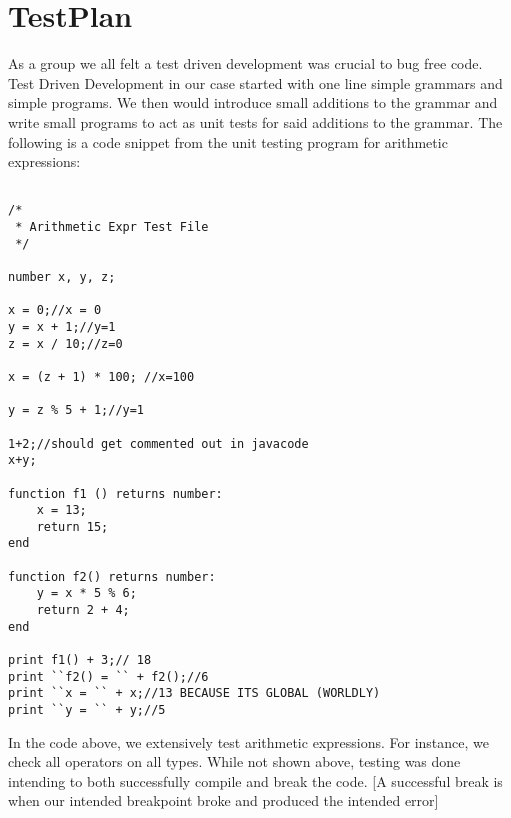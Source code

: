 \chapter{TestPlan}\label{TestPlan}

As a group we all felt a test driven development was crucial to bug
free code.  Test Driven Development in our case started with one line
simple grammars and simple programs.  We then would introduce small
additions to the grammar and write small programs to act as unit tests
for said additions to the grammar.  The following is a code snippet
from the unit testing program for arithmetic expressions:

\begin{singlespacing}
\begin{verbatim}

/*
 * Arithmetic Expr Test File
 */

number x, y, z;

x = 0;//x = 0
y = x + 1;//y=1
z = x / 10;//z=0

x = (z + 1) * 100; //x=100

y = z % 5 + 1;//y=1

1+2;//should get commented out in javacode
x+y;

function f1 () returns number:
    x = 13;
    return 15;
end

function f2() returns number:
    y = x * 5 % 6;
    return 2 + 4;
end

print f1() + 3;// 18
print ``f2() = `` + f2();//6
print ``x = `` + x;//13 BECAUSE ITS GLOBAL (WORLDLY)
print ``y = `` + y;//5

\end{verbatim}
\end{singlespacing}

In the code above, we extensively test arithmetic expressions.  For
instance, we check all operators on all types.  While not shown above,
testing was done intending to both successfully compile and break the
code. [A successful break is when our intended breakpoint broke and
  produced the intended error]  

